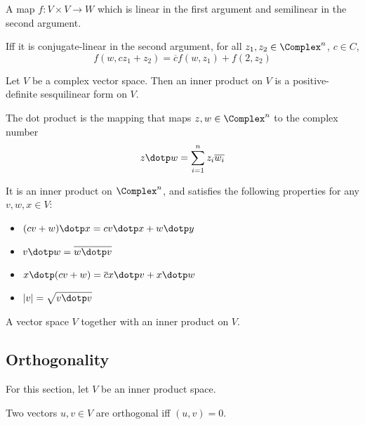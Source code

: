 \begin{definition}
  A map $f : V \times V \to W$ which is linear in the first argument and semilinear in the second argument.

  Iff it is conjugate-linear in the second argument, for all $z_1, z_2 \in \Complex^n$, $c \in C$,
  \[
    f(w, cz_1 + z_2) = \overline{c} f(w, z_1) + f(2, z_2)
  \]
\end{definition}

\begin{definition}
  Let $V$ be a complex vector space. Then an inner product on $V$ is a positive-definite sesquilinear form on $V$.
\end{definition}

\begin{definition}
  The dot product is the mapping that maps $z, w \in \Complex^n$ to the complex number
  \[
    z \dotp w = \sum_{i=1}^n z_i \overline{w_i}
  \]

  It is an inner product on $\Complex^n$, and satisfies the following properties for any $v, w, x \in V$:
  \begin{itemize}
    \item $(cv + w) \dotp x = cv \dotp x + w \dotp y$
    \item $v \dotp w = \overline{w \dotp v}$
    \item $x \dotp (cv + w) = \overline{c}x \dotp v + x \dotp w$
    \item $|v| = \sqrt{v \dotp v}$
  \end{itemize}
\end{definition}

\begin{definition}
  A vector space $V$ together with an inner product on $V$.
\end{definition}

\subsection{Orthogonality}


For this section, let $V$ be an inner product space.

\begin{definition}[Orthogonality]
  Two vectors $u, v \in V$ are orthogonal iff $(u, v) = 0$.
\end{definition}

